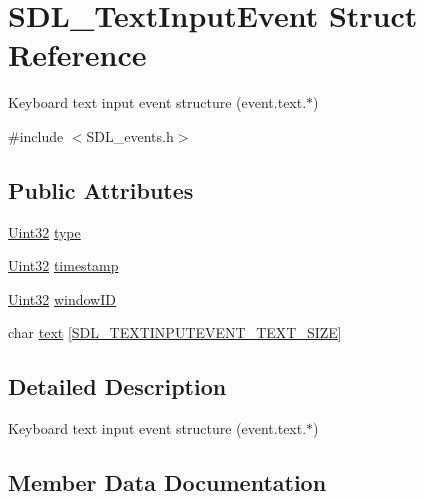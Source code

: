 \hypertarget{struct_s_d_l___text_input_event}{}\section{S\+D\+L\+\_\+\+Text\+Input\+Event Struct Reference}
\label{struct_s_d_l___text_input_event}


Keyboard text input event structure (event.\+text.$\ast$)  




{\ttfamily \#include $<$S\+D\+L\+\_\+events.\+h$>$}

\subsection*{Public Attributes}
\begin{DoxyCompactItemize}
\item 
\hyperlink{_s_d_l__stdinc_8h_add440eff171ea5f55cb00c4a9ab8672d}{Uint32} \hyperlink{struct_s_d_l___text_input_event_a90576be2ea52e694deff40d0586654f5}{type}
\item 
\hyperlink{_s_d_l__stdinc_8h_add440eff171ea5f55cb00c4a9ab8672d}{Uint32} \hyperlink{struct_s_d_l___text_input_event_a20b190a96494918690ea7f99187be948}{timestamp}
\item 
\hyperlink{_s_d_l__stdinc_8h_add440eff171ea5f55cb00c4a9ab8672d}{Uint32} \hyperlink{struct_s_d_l___text_input_event_aeb4f7a939353990ca40261ffbfbeb3d0}{window\+ID}
\item 
char \hyperlink{struct_s_d_l___text_input_event_a1a95531f466dff01c2f108f53ff24554}{text} \mbox{[}\hyperlink{_s_d_l__events_8h_a43822437fd5e89c1da1841a813cad4aa}{S\+D\+L\+\_\+\+T\+E\+X\+T\+I\+N\+P\+U\+T\+E\+V\+E\+N\+T\+\_\+\+T\+E\+X\+T\+\_\+\+S\+I\+ZE}\mbox{]}
\end{DoxyCompactItemize}


\subsection{Detailed Description}
Keyboard text input event structure (event.\+text.$\ast$) 

\subsection{Member Data Documentation}
\mbox{\label{struct_s_d_l___text_input_event_a1a95531f466dff01c2f108f53ff24554}} 
